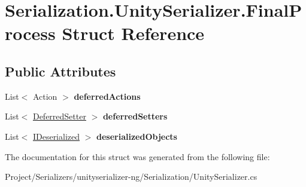 \hypertarget{struct_serialization_1_1_unity_serializer_1_1_final_process}{}\section{Serialization.\+Unity\+Serializer.\+Final\+Process Struct Reference}
\label{struct_serialization_1_1_unity_serializer_1_1_final_process}
\subsection*{Public Attributes}
\begin{DoxyCompactItemize}
\item 
\mbox{\label{struct_serialization_1_1_unity_serializer_1_1_final_process_a203207ba91b57bf3588b7001ada7a4be}} 
List$<$ Action $>$ {\bfseries deferred\+Actions}
\item 
\mbox{\label{struct_serialization_1_1_unity_serializer_1_1_final_process_a4357b67e1c7e3cd82081012c44e28cec}} 
List$<$ \hyperlink{class_serialization_1_1_unity_serializer_1_1_deferred_setter}{Deferred\+Setter} $>$ {\bfseries deferred\+Setters}
\item 
\mbox{\label{struct_serialization_1_1_unity_serializer_1_1_final_process_a9f54fa322554963f0f17a5ca1fe4b8fc}} 
List$<$ \hyperlink{interface_i_deserialized}{I\+Deserialized} $>$ {\bfseries deserialized\+Objects}
\end{DoxyCompactItemize}


The documentation for this struct was generated from the following file\+:\begin{DoxyCompactItemize}
\item 
Project/\+Serializers/unityserializer-\/ng/\+Serialization/Unity\+Serializer.\+cs\end{DoxyCompactItemize}

